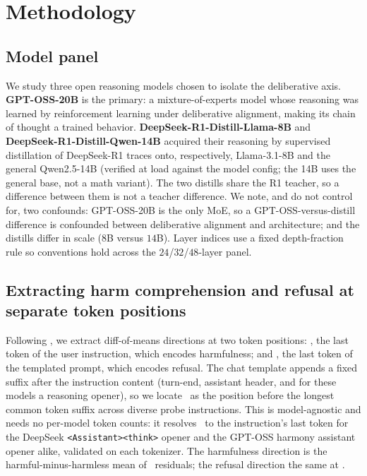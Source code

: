 \section{Methodology}\label{sec:methodology}

\subsection{Model panel}\label{model-panel}

We study three open reasoning models chosen to isolate the deliberative axis.
\textbf{GPT-OSS-20B} \citep{openai2025gptoss} is the primary: a mixture-of-experts model
whose reasoning was learned by reinforcement learning under deliberative alignment,
making its chain of thought a trained behavior. \textbf{DeepSeek-R1-Distill-Llama-8B} and
\textbf{DeepSeek-R1-Distill-Qwen-14B} \citep{deepseek2025r1} acquired their reasoning by
supervised distillation of DeepSeek-R1 traces onto, respectively, Llama-3.1-8B and
the general Qwen2.5-14B (verified at load against the model config; the 14B uses the
general base, not a math variant). The two distills share the R1 teacher, so a
difference between them is not a teacher difference. We note, and do not control
for, two confounds: GPT-OSS-20B is the only MoE, so a GPT-OSS-versus-distill
difference is confounded between deliberative alignment and architecture; and the
distills differ in scale (\(8\)B versus \(14\)B). Layer indices use a fixed
depth-fraction rule so conventions hold across the \(24\)/\(32\)/\(48\)-layer panel.

\subsection{Extracting harm comprehension and refusal at separate token positions}\label{extracting-harm-comprehension-and-refusal-at-separate-token-positions}

Following \citet{zhao2025harmfulness}, we extract diff-of-means directions at two
token positions: \tinst, the last token of the user instruction, which encodes
harmfulness; and \tpost, the last token of the templated prompt, which encodes
refusal. The chat template appends a fixed suffix after the instruction content
(turn-end, assistant header, and for these models a reasoning opener), so we locate
\tinst~as the position before the longest common token suffix across diverse probe
instructions. This is model-agnostic and needs no per-model token counts: it
resolves \tinst~to the instruction's last token for the DeepSeek
\texttt{\textless{}\textbar{}Assistant\textbar{}\textgreater{}\textless{}think\textgreater{}} opener and the GPT-OSS harmony assistant opener alike,
validated on each tokenizer. The harmfulness direction is the harmful-minus-harmless
mean of \tinst~residuals; the refusal direction the same at \tpost.

